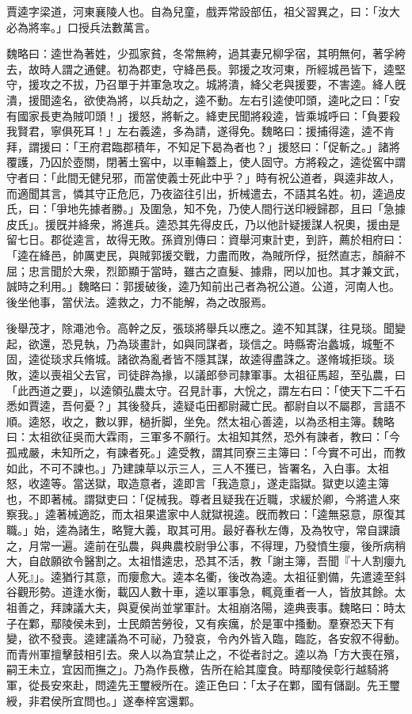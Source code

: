 
\begin{pinyinscope}
賈逵字梁道，河東襄陵人也。自為兒童，戲弄常設部伍，祖父習異之，曰：「汝大必為將率。」口授兵法數萬言。

魏略曰：逵世為著姓，少孤家貧，冬常無絝，過其妻兄柳孚宿，其明無何，著孚絝去，故時人謂之通健。初為郡吏，守絳邑長。郭援之攻河東，所經城邑皆下，逵堅守，援攻之不拔，乃召單于并軍急攻之。城將潰，絳父老與援要，不害逵。絳人旣潰，援聞逵名，欲使為將，以兵劫之，逵不動。左右引逵使叩頭，逵叱之曰：「安有國家長吏為賊叩頭！」援怒，將斬之。絳吏民聞將殺逵，皆乘城呼曰：「負要殺我賢君，寧俱死耳！」左右義逵，多為請，遂得免。魏略曰：援捕得逵，逵不肯拜，謂援曰：「王府君臨郡積年，不知足下曷為者也？」援怒曰：「促斬之。」諸將覆護，乃囚於壺關，閉著土窖中，以車輪蓋上，使人固守。方將殺之，逵從窖中謂守者曰：「此間无健兒邪，而當使義士死此中乎？」時有祝公道者，與逵非故人，而適聞其言，憐其守正危厄，乃夜盜往引出，折械遣去，不語其名姓。初，逵過皮氏，曰：「爭地先據者勝。」及圍急，知不免，乃使人間行送印綬歸郡，且曰「急據皮氏」。援旣并絳衆，將進兵。逵恐其先得皮氏，乃以他計疑援謀人祝奧，援由是留七日。郡從逵言，故得无敗。孫資別傳曰：資舉河東計吏，到許，薦於相府曰：「逵在絳邑，帥厲吏民，與賊郭援交戰，力盡而敗，為賊所俘，挺然直志，顏辭不屈；忠言聞於大衆，烈節顯于當時，雖古之直髮、據鼎，罔以加也。其才兼文武，誠時之利用。」魏略曰：郭援破後，逵乃知前出己者為祝公道。公道，河南人也。後坐他事，當伏法。逵救之，力不能解，為之改服焉。

後舉茂才，除澠池令。高幹之反，張琰將舉兵以應之。逵不知其謀，往見琰。聞變起，欲還，恐見執，乃為琰畫計，如與同謀者，琰信之。時縣寄治蠡城，城塹不固，逵從琰求兵脩城。諸欲為亂者皆不隱其謀，故逵得盡誅之。遂脩城拒琰。琰敗，逵以喪祖父去官，司徒辟為掾，以議郎參司隷軍事。太祖征馬超，至弘農，曰「此西道之要」，以逵領弘農太守。召見計事，大恱之，謂左右曰：「使天下二千石悉如賈逵，吾何憂？」其後發兵，逵疑屯田都尉藏亡民。都尉自以不屬郡，言語不順。逵怒，收之，數以罪，檛折脚，坐免。然太祖心善逵，以為丞相主簿。魏略曰：太祖欲征吳而大霖雨，三軍多不願行。太祖知其然，恐外有諫者，教曰：「今孤戒嚴，未知所之，有諫者死。」逵受教，謂其同寮三主簿曰：「今實不可出，而教如此，不可不諫也。」乃建諫草以示三人，三人不獲已，皆署名，入白事。太祖怒，收逵等。當送獄，取造意者，逵即言「我造意」，遂走詣獄。獄吏以逵主簿也，不即著械。謂獄吏曰：「促械我。尊者且疑我在近職，求緩於卿，今將遣人來察我。」逵著械適訖，而太祖果遣家中人就獄視逵。旣而教曰：「逵無惡意，原復其職。」始，逵為諸生，略覽大義，取其可用。最好春秋左傳，及為牧守，常自課讀之，月常一遍。逵前在弘農，與典農校尉爭公事，不得理，乃發憤生癭，後所病稍大，自啟願欲令醫割之。太祖惜逵忠，恐其不活，教「謝主簿，吾聞『十人割癭九人死』」。逵猶行其意，而癭愈大。逵本名衢，後改為逵。太祖征劉備，先遣逵至斜谷觀形勢。道逢水衡，載囚人數十車，逵以軍事急，輒竟重者一人，皆放其餘。太祖善之，拜諫議大夫，與夏侯尚並掌軍計。太祖崩洛陽，逵典喪事。魏略曰：時太子在鄴，鄢陵侯未到，士民頗苦勞役，又有疾癘，於是軍中搔動。羣寮恐天下有變，欲不發喪。逵建議為不可祕，乃發哀，令內外皆入臨，臨訖，各安叙不得動。而青州軍擅擊鼓相引去。衆人以為宜禁止之，不從者討之。逵以為「方大喪在殯，嗣王未立，宜因而撫之」。乃為作長檄，告所在給其廩食。時鄢陵侯彰行越騎將軍，從長安來赴，問逵先王璽綬所在。逵正色曰：「太子在鄴，國有儲副。先王璽綬，非君侯所宜問也。」遂奉梓宮還鄴。


\end{pinyinscope}

